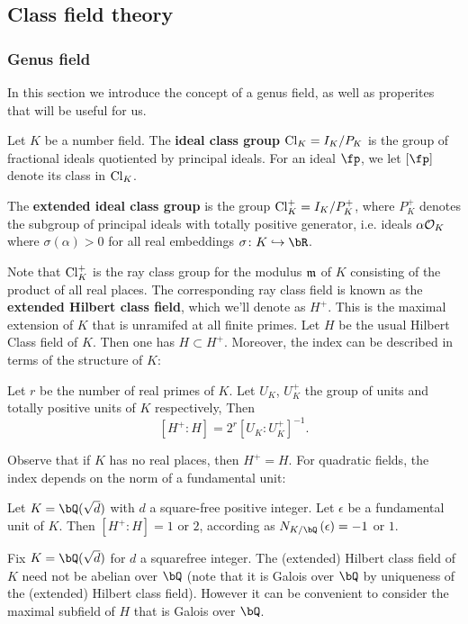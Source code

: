 \subsection{Class field theory}
\subsubsection{Genus field}

In this section we introduce the concept of a genus field, as well as properites that will be useful for us.

Let $K$ be a number field. The \textbf{ideal class group} $\mathrm{Cl}_K = I_K / P_K$ is the group of fractional ideals quotiented by principal ideals.
For an ideal $\fp$, we let $[\fp]$ denote its class in $\mathrm{Cl}_K$.

The \textbf{extended ideal class group} is the group $\mathrm{Cl}_K^{+} = I_K / P_K^{+}$, where
$P_K^{+}$ denotes the subgroup of principal ideals with totally positive generator, i.e. ideals $\alpha \mathcal{O}_K$ where $\sigma(\alpha) > 0$ for all real embeddings $\sigma \colon K \emb \bR$.

Note that $\mathrm{Cl}_K^{+}$ is the ray class group for the modulus $\mathfrak{m}$ of $K$ consisting of the product of all real places. The corresponding ray class field is known as the \textbf{extended Hilbert class field}, which we'll denote as $H^{+}$. This is the maximal extension of $K$ that is unramifed at all finite primes. Let $H$ be the usual Hilbert Class field of $K$. Then one has $H \subset H^{+}$. Moreover, the index can be described in terms of the structure of $K$:

\begin{thm}
    Let $r$ be the number of real primes of $K$. Let $U_K$, $U_K^{+}$ the group of units and totally positive units of $K$ respectively, Then 
    \[ [H^{+} \colon H] = 2^r [U_K \colon U_K^{+}]^{-1} .\]
\end{thm}
Observe that if $K$ has no real places, then $H^{+} = H$. For quadratic fields, the index depends on the norm of a fundamental unit:

\begin{cor}
    Let $K = \bQ(\sqrt{d})$ with $d$ a square-free positive integer. Let $\epsilon$ be a fundamental unit of $K$. Then $[H^{+} \colon H] = 1$ or $2$, according as $N_{K / \bQ}\left(\epsilon\right) = -1$ or $1$. 
\end{cor}


Fix $K = \bQ(\sqrt{d})$ for $d$ a squarefree integer. The (extended) Hilbert class field of $K$ need not be abelian over $\bQ$ (note that it is Galois over $\bQ$ by uniqueness of the (extended) Hilbert class field). However it can be convenient to consider the maximal subfield of $H$ that is Galois over $\bQ$. 

